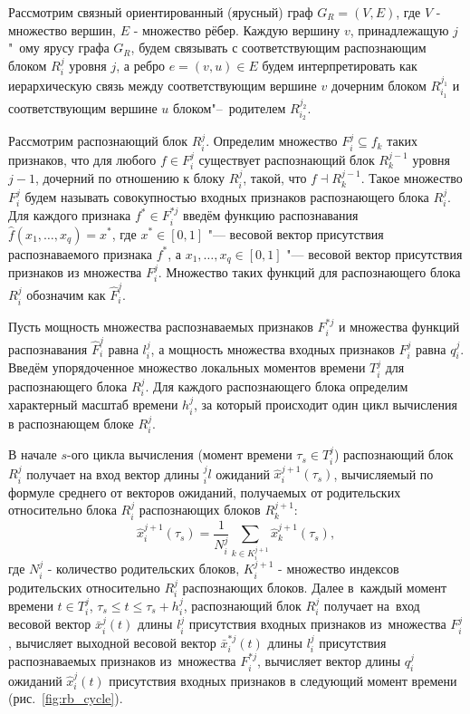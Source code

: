 Рассмотрим связный ориентированный (ярусный) граф $G_R=(V,E)$, где $V$ - множество вершин, $E$ - множество рёбер. Каждую вершину $v$, принадлежащую $j$"~ому ярусу графа $G_R$, будем связывать с соответствующим распознающим блоком $R_i^j$ уровня $j$, а ребро $e=(v,u){\in}E$ будем интерпретировать как иерархическую связь между соответствующим вершине $v$ дочерним блоком $R_{i_1}^{j_1 }$ и соответствующим вершине $u$ блоком"--~родителем $R_{i_2}^{j_2}$.

Рассмотрим распознающий блок $R_i^j$. Определим множество $F_i^j{\subseteq}{f_k}$ таких признаков, что для любого $f{\in}F_i^j$ существует распознающий блок $R_k^{j-1}$ уровня $j-1$, дочерний по отношению к блоку $R_i^j$, такой, что $f{\dashv}R_k^{j-1}$. Такое множество $F_i^j$ будем называть совокупностью входных признаков распознающего блока $R_i^j$. Для каждого признака $f^*{\in}F_i^{*j}$ введём функцию распознавания $\hat{f}(x_1,\dots,x_q )=x^*$, где $x^*{\in}[0,1]$ "--- весовой вектор присутствия распознаваемого признака $f^*$, а $x_1,\dots,x_q{\in}[0,1]$ "--- весовой вектор присутствия признаков из множества $F_i^j$. Множество таких функций для распознающего блока $R_i^j$ обозначим как $\hat{F}_i^j$.

Пусть мощность множества распознаваемых признаков $F_i^{*j}$ и множества функций распознавания $\hat{F}_i^j$ равна $l_i^j$, а мощность множества входных признаков $F_i^j$ равна $q_i^j$. Введём упорядоченное множество локальных моментов времени $T_i^j$ для распознающего блока $R_i^j$. Для каждого распознающего блока определим характерный масштаб времени $h_i^j$, за который происходит один цикл вычисления в распознающем блоке $R_i^j$. 

В начале $s$-ого цикла вычисления (момент времени $\tau_s\in{T_i^j}$)  распознающий блок $R_i^j$ получает на вход вектор длины $_i^jl$ ожиданий $\hat{x}_i^{j+1}(\tau_s)$, вычисляемый по формуле среднего от векторов ожиданий, получаемых от родительских относительно блока $R_i^j$ распознающих блоков $R_k^{j+1}$:
\[
\hat{x}_i^{j+1}(\tau_s)=\frac{1}{N_i^j}\sum_{k{\in}K_i^{j+1}}\hat{x}_k^{j+1}(\tau_s),
\]
где $N_i^j$ - количество родительских блоков, $K_i^{j+1}$ - множество индексов родительских относительно $R_i^j$ распознающих блоков. Далее в~каждый момент времени $t\in{T_i^j}$, $\tau_s\leqslant{t}\leqslant\tau_s+h_i^j$,  распознающий блок $R_i^j$ получает на~вход весовой вектор $\bar{x}_i^j(t)$ длины $l_i^j$ присутствия входных признаков из~множества $F_i^j$, вычисляет выходной весовой вектор $\bar{x}_i^{*j}(t)$ длины $l_i^j$ присутствия распознаваемых признаков из~множества $F_i^{*j}$, вычисляет вектор длины $q_i^j$ ожиданий $\hat{x}_i^j(t)$ присутствия входных признаков в следующий момент времени (рис.~\ref{fig:rb_cycle}).
	
